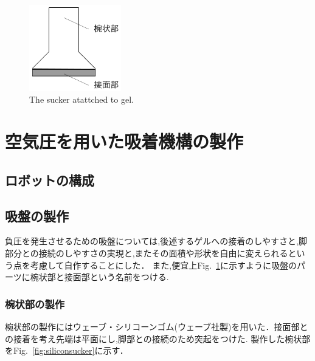\documentclass[uplatex,dvipdfmx]{jlreq}
\begin{document}
\begin{figure}
    \centering
    \includegraphics[width=40mm]{./figure/model_sucker.png}
    \caption{The sucker atattched to gel.}
    \label{fig:model_sucker}
\end{figure}

\section{空気圧を用いた吸着機構の製作}
\subsection{ロボットの構成}
\subsection{吸盤の製作}
負圧を発生させるための吸盤については,後述するゲルへの接着のしやすさと,脚部分との接続のしやすさの実現と,またその面積や形状を自由に変えられるという点を考慮して自作することにした．
また,便宜上Fig.~\ref{fig:model_sucker}に示すように吸盤のパーツに椀状部と接面部という名前をつける.
\subsubsection{椀状部の製作}
椀状部の製作にはウェーブ・シリコーンゴム(ウェーブ社製)を用いた．接面部との接着を考え先端は平面にし,脚部との接続のため突起をつけた.
製作した椀状部をFig.~\ref{fig:siliconsucker}に示す．
\end{document}
